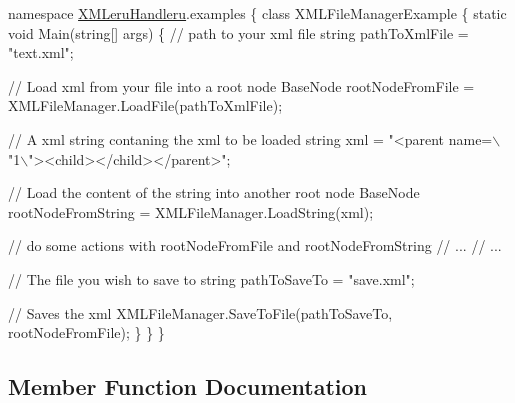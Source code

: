 \begin{DoxyCodeInclude}
\textcolor{keyword}{namespace }\hyperlink{namespace_x_m_leru_handleru}{XMLeruHandleru}.examples
\{
    \textcolor{keyword}{class }XMLFileManagerExample
    \{
        \textcolor{keyword}{static} \textcolor{keywordtype}{void} Main(\textcolor{keywordtype}{string}[] args)
        \{
            \textcolor{comment}{// path to your xml file}
            \textcolor{keywordtype}{string} pathToXmlFile = \textcolor{stringliteral}{"text.xml"};

            \textcolor{comment}{// Load xml from your file into a root node}
            BaseNode rootNodeFromFile = XMLFileManager.LoadFile(pathToXmlFile);

            \textcolor{comment}{// A xml string contaning the xml to be loaded}
            \textcolor{keywordtype}{string} xml = \textcolor{stringliteral}{"<parent name=\(\backslash\)"1\(\backslash\)"><child></child></parent>"};

            \textcolor{comment}{// Load the content of the string into another root node}
            BaseNode rootNodeFromString = XMLFileManager.LoadString(xml);

            \textcolor{comment}{// do some actions with rootNodeFromFile and rootNodeFromString}
            \textcolor{comment}{// ...}
            \textcolor{comment}{// ...}

            \textcolor{comment}{// The file you wish to save to}
            \textcolor{keywordtype}{string} pathToSaveTo = \textcolor{stringliteral}{"save.xml"};

            \textcolor{comment}{// Saves the xml}
            XMLFileManager.SaveToFile(pathToSaveTo, rootNodeFromFile);
        \}
    \}
\}
\end{DoxyCodeInclude}
 

\subsection{Member Function Documentation}
\hypertarget{class_x_m_leru_handleru_1_1_x_m_l_file_manager_adb410d025ea3a465f050996541bb9d1c}{}
